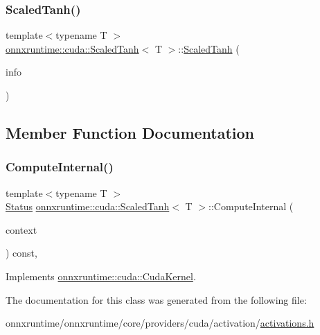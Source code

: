 \subsubsection{\texorpdfstring{Scaled\+Tanh()}{ScaledTanh()}}
{\footnotesize\ttfamily template$<$typename T $>$ \\
\mbox{\hyperlink{classonnxruntime_1_1cuda_1_1ScaledTanh}{onnxruntime\+::cuda\+::\+Scaled\+Tanh}}$<$ T $>$\+::\mbox{\hyperlink{classonnxruntime_1_1cuda_1_1ScaledTanh}{Scaled\+Tanh}} (\begin{DoxyParamCaption}\item[{const \mbox{\hyperlink{classonnxruntime_1_1OpKernelInfo}{Op\+Kernel\+Info}} \&}]{info }\end{DoxyParamCaption})\hspace{0.3cm}{\ttfamily [inline]}}



\subsection{Member Function Documentation}
\mbox{\label{classonnxruntime_1_1cuda_1_1ScaledTanh_ae1ad07730687c6f16f28c496dddf9490}} 
\subsubsection{\texorpdfstring{Compute\+Internal()}{ComputeInternal()}}
{\footnotesize\ttfamily template$<$typename T $>$ \\
\mbox{\hyperlink{classonnxruntime_1_1common_1_1Status}{Status}} \mbox{\hyperlink{classonnxruntime_1_1cuda_1_1ScaledTanh}{onnxruntime\+::cuda\+::\+Scaled\+Tanh}}$<$ T $>$\+::Compute\+Internal (\begin{DoxyParamCaption}\item[{\mbox{\hyperlink{classonnxruntime_1_1OpKernelContext}{Op\+Kernel\+Context}} $\ast$}]{context }\end{DoxyParamCaption}) const\hspace{0.3cm}{\ttfamily [override]}, {\ttfamily [virtual]}}



Implements \mbox{\hyperlink{classonnxruntime_1_1cuda_1_1CudaKernel_aca7af04ae448017d6023d30bba231ebb}{onnxruntime\+::cuda\+::\+Cuda\+Kernel}}.



The documentation for this class was generated from the following file\+:\begin{DoxyCompactItemize}
\item 
onnxruntime/onnxruntime/core/providers/cuda/activation/\mbox{\hyperlink{cuda_2activation_2activations_8h}{activations.\+h}}\end{DoxyCompactItemize}
